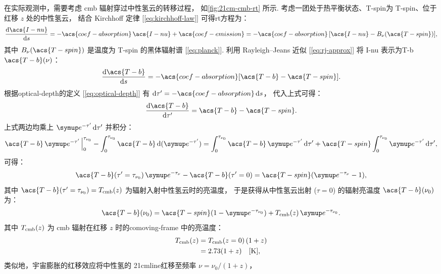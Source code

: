 在实际观测中，需要考虑 \ac{cmb} 辐射穿过中性氢云的转移过程，
如\autoref{fig:21cm-cmb-rt} 所示.
考虑一团处于热平衡状态、\acl{T-spin}为 \acs{T-spin}、位于红移 $z$ 处的中性氢云，
结合 Kirchhoff 定律 [\autoref{eq:kirchhoff-law}] 可得\ac{rt}方程为：
\begin{equation}
  \diff{\acs{I-nu}}{s}
    = -\acs{coef-absorption}\,\acs{I-nu} + \acs{coef-emission}
    = -\acs{coef-absorption}\,[\acs{I-nu} - B_{\nu}(\acs{T-spin})] ,
\end{equation}
其中
$B_{\nu}(\acs{T-spin})$ 是温度为 \acs{T-spin} 的黑体辐射谱 [\autoref{eq:planck}].
利用 Rayleigh--Jeans 近似 [\autoref{eq:rj-approx}]
将 \acs{I-nu} 表示为\acl{T-b} $\acs{T-b}(\nu)$：
\begin{equation}
  \diff{\acs{T-b}}{s}
    = -\acs{coef-absorption} [\acs{T-b} - \acs{T-spin}] .
\end{equation}
根据\acl{optical-depth}的定义 [\autoref{eq:optical-depth}]
有 $\D{\tau'} = -\acs{coef-absorption}\,\D{s}$，
代入上式可得：
\begin{equation}
  \diff{\acs{T-b}}{\tau'} = \acs{T-b} - \acs{T-spin} .
\end{equation}
上式两边均乘上 $\Ce^{-\tau'}\,\D{\tau'}$ 并积分：
\begin{equation}
  \acs{T-b}\,\Ce^{-\tau'}\,\Big|_0^{\tau_{\nu_0}}
      - \int_0^{\tau_{\nu_0}} \acs{T-b}\,\D{(\Ce^{-\tau'})}
    = \int_0^{\tau_{\nu_0}} \acs{T-b}\,\Ce^{-\tau'}\,\D{\tau'}
      + \acs{T-spin} \int_0^{\tau_{\nu_0}} \Ce^{-\tau'}\,\D{\tau'} ,
\end{equation}
可得：
\begin{equation}
  \acs{T-b}(\tau'=\tau_{\nu_0})\,\Ce^{-\tau_{\nu}} - \acs{T-b}(\tau'=0)
    = \acs{T-spin} (\Ce^{-\tau_{\nu}} - 1) ,
\end{equation}
其中 $\acs{T-b}(\tau'=\tau_{\nu_0}) = T_{\R{cmb}}(z)$
为辐射入射中性氢云时的亮温度，
于是获得从中性氢云出射 ($\tau = 0$) 的辐射亮温度 $\acs{T-b}(\nu_0)$ 为：
\begin{equation}
  \acs{T-b}(\nu_0)
    = \acs{T-spin} (1 - \Ce^{-\tau_{\nu_0}})
      + T_{\R{cmb}}(z) \,\Ce^{-\tau_{\nu_0}} .
\end{equation}
其中 $T_{\mathrm{cmb}}(z)$ 为 \ac{cmb} 辐射在红移 $z$ 时的\ac{comoving-frame}
中的亮温度：
\begin{align}
  T_{\mathrm{cmb}}(z)
    & = T_{\mathrm{cmb}}(z=0)\,(1+z)  \\
    & = 2.73 (1+z) \quad [\si{\kelvin}] ,
\end{align}
类似地，宇宙膨胀的红移效应将中性氢的 \ac{21cmline}红移至频率 $\nu = \nu_0/(1+z)$，
